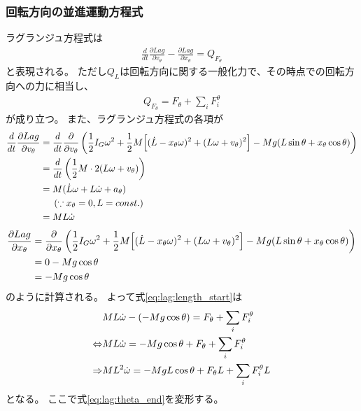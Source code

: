 \documentclass[a4paper,11pt]{jsarticle}
\begin{document}
\subsubsection*{回転方向の並進運動方程式}
ラグランジュ方程式は
\begin{align*}
  \frac{d}{dt}\frac{\partial Lag}{\partial v_\theta} - \frac{\partial Lag}{\partial x_\theta} = Q_{F_\theta}
\end{align*}
と表現される。
ただし$Q_L$は回転方向に関する一般化力で、その時点での回転方向への力に相当し、
\begin{align*}
  Q_{F_\theta} = F_\theta + \sum_i F_i^\theta
\end{align*}
が成り立つ。
また、ラグランジュ方程式の各項が
\begin{align*}
  \frac{d}{dt}\frac{\partial Lag}{\partial v_\theta}
  &= \frac{d}{dt}\frac{\partial }{\partial v_\theta}
  \left(
    \frac{1}{2}I_G\omega^2
    + \frac{1}{2}M
    \Bigl[ (\dot{L} - x_\theta \omega)^2 + (L\omega + v_\theta)^2 \Bigr]
    - Mg ( L\sin\theta + x_\theta \cos\theta )
  \right)
  \\
  & = \frac{d}{dt}\left( \frac{1}{2}M \cdot 2(L\omega + v_\theta )\right)
  \\
  &= M( \dot{L}\omega + L\dot\omega + a_\theta )
  \\
  & \ \ \ \ \left( \because x_\theta = 0, L = const. \right)
  \\
  &= M L \dot\omega
\end{align*}
\begin{align*}
  \frac{\partial Lag}{\partial x_\theta}
  &= \frac{\partial }{\partial x_\theta}
  \left(
    \frac{1}{2}I_G\omega^2
    + \frac{1}{2}M
    \Bigl[ (\dot{L} - x_\theta \omega)^2 + (L\omega + v_\theta)^2 \Bigr]
    - Mg ( L\sin\theta + x_\theta \cos\theta )
  \right)
  \\
  &= 0 - Mg\cos\theta
  \\
  &= - Mg\cos\theta
\end{align*}
のように計算される。
よって式\ref{eq:lag:length_start}は
\begin{align}
  & M L \dot\omega - ( - Mg\cos\theta ) = F_\theta + \sum_i F_i^\theta
  \notag
  \\
  \Leftrightarrow
  & M L \dot\omega = - Mg \cos\theta + F_\theta + \sum_i F_i^\theta
  \notag
  \\
  \Rightarrow
  & M L^2 \dot\omega = - Mg L \cos\theta + F_\theta L + \sum_i F_i^\theta L
  \label{eq:lag:x_middle}
\end{align}
となる。
ここで式\ref{eq:lag:theta_end}を変形する。
\end{document}
